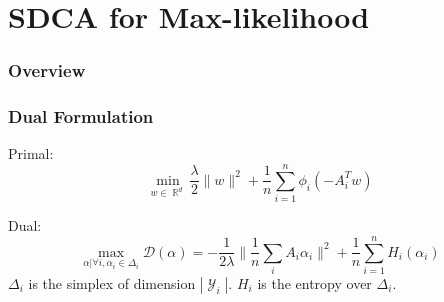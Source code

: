 \documentclass{beamer}
\DeclareMathOperator{\R}{\mathbb{R}}
\DeclareMathOperator{\1}{\mathbb{1}}
\DeclareMathOperator{\Y}{\mathcal{Y}}
\DeclareMathOperator{\dom}{Dom}
\begin{document}
\section{SDCA for Max-likelihood}
\begin{frame}
	\frametitle{Overview}
	\tableofcontents[currentsection] 
\end{frame}
%
%
%
%
\begin{frame}
\frametitle{Dual Formulation}

Primal:
\begin{equation*}
	\min_{w\in\R^d}  \frac{\lambda}{2}\|w\|^2 + \frac{1}{n}   \sum_{i=1}^{n} \phi_i(-A_i^Tw)
\end{equation*}

Dual:
\begin{equation*}
	\max_{\alpha | \forall i, \alpha_i \in \Delta_i} \mathscr{D}(\alpha) = -\frac{1}{2\lambda} \| \frac{1}{n} \sum_i A_i \alpha_i \|^2 + \frac{1}{n} \sum_{i=1}^n H_i(\alpha_i)
\end{equation*}
$\Delta_i$ is the simplex of dimension $|\Y_i|$.
$H_i$ is the entropy over $\Delta_i$.

\end{frame}
\end{document}
